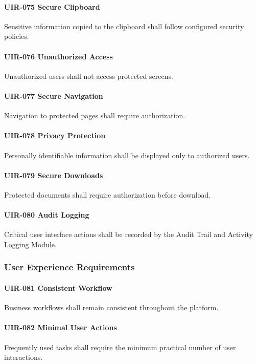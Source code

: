 \paragraph{UIR-075 Secure Clipboard}
Sensitive information copied to the clipboard shall follow configured
security policies.

\paragraph{UIR-076 Unauthorized Access}
Unauthorized users shall not access protected screens.

\paragraph{UIR-077 Secure Navigation}
Navigation to protected pages shall require authorization.

\paragraph{UIR-078 Privacy Protection}
Personally identifiable information shall be displayed only to
authorized users.

\paragraph{UIR-079 Secure Downloads}
Protected documents shall require authorization before download.

\paragraph{UIR-080 Audit Logging}
Critical user interface actions shall be recorded by the Audit Trail and
Activity Logging Module.

\subsubsection*{User Experience Requirements}

\paragraph{UIR-081 Consistent Workflow}
Business workflows shall remain consistent throughout the platform.

\paragraph{UIR-082 Minimal User Actions}
Frequently used tasks shall require the minimum practical number of user
interactions.

